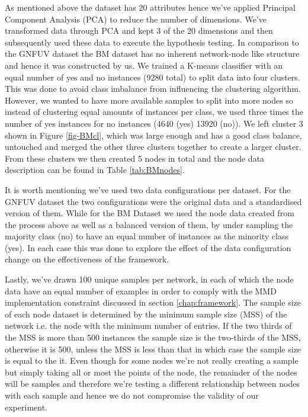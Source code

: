 \documentclass{mpaper}
\begin{document}
As mentioned above the dataset has 20 attributes hence we've applied Principal Component Analysis (PCA) to reduce the number of dimensions. We've transformed data through PCA and kept 3 of the 20 dimensions and then subsequently used these data to execute the hypothesis testing. In comparison to the GNFUV dataset the BM dataset has no inherent network-node like structure and hence it was constructed by us. We trained a K-means classifier with an equal number of yes and no instances (9280 total) to split data into four clusters. This was done to avoid class imbalance from influencing the clustering algorithm. However, we wanted to have more available samples to split into more nodes so instead of clustering equal amounts of instances per class, we used three times the number of yes instances for no instances (4640 (yes) 13920 (no)). We left cluster 3 shown in Figure \ref{fig-BMcl}, which was large enough and has a good class balance, untouched and merged the other three clusters together to create a larger cluster. From these clusters we then created 5 nodes in total and the node data description can be found in Table \ref{tab:BMnodes}. 

It is worth mentioning we've used two data configurations per dataset. For the GNFUV dataset the two configurations were the original data and a standardised version of them. While for the BM Dataset we used the node data created from the process above as well as a balanced version of them, by under sampling the majority class (no) to have an equal number of instances as the minority class (yes). In each case this was done to explore the effect of the data configuration change on the effectiveness of the framework. 

Lastly, we've drawn 100 unique samples per network, in each of which the node data have an equal number of examples in order to comply with the MMD implementation constraint discussed in section \ref{chap:framework}. The sample size of each node dataset is determined by the minimum sample size (MSS) of the network i.e. the node with the minimum number of entries. If the two thirds of the MSS is more than 500 instances the sample size is the two-thirds of the MSS, otherwise it is 500, unless the MSS is less than that in which case the sample size is equal to the it. Even though for some nodes we're not really creating a sample but simply taking all or most the points of the node, the remainder of the nodes will be samples and therefore we're testing a different relationship between nodes with each sample and hence we do not compromise the validity of our experiment.
\end{document}
